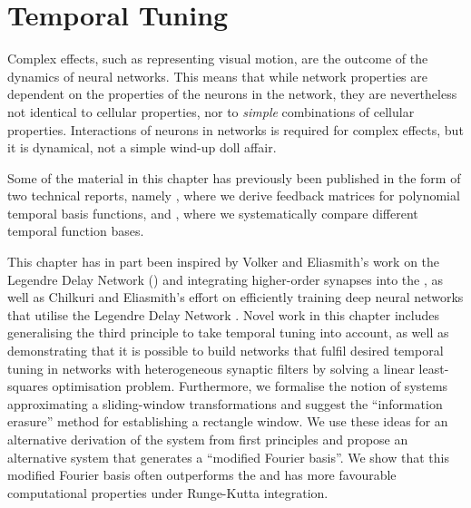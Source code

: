 \chapter{Temporal Tuning}
\label{chp:temporal_tuning}

\vspace{20pt}

\begin{OpeningQuote}
Complex effects, such as representing visual motion, are the outcome of the dynamics of neural networks. This means that while network properties are dependent on the properties of the neurons in the network, they are nevertheless not identical to cellular properties, nor to \emph{simple} combinations of cellular properties. Interactions of neurons in networks is required for complex effects, but it is dynamical, not a simple wind-up doll affair.
\end{OpeningQuote}

\begin{PriorPublication}
Some of the material in this chapter has previously been published in the form of two technical reports, namely \citet{stockel2021constructing}, where we derive feedback matrices for polynomial temporal basis functions, and \citet{stockel2021discrete}, where we systematically compare different temporal function bases.
\end{PriorPublication}

\begin{Contributions}
This chapter has in part been inspired by Volker and Eliasmith's work on the Legendre Delay Network (\LDN) and integrating higher-order synapses into the \NEF \citep{voelker2018improving,voelker2019}, as well as Chilkuri and Eliasmith's effort on efficiently training deep neural networks that utilise the Legendre Delay Network \citep{chilkuri2021parallelizing}.
Novel work in this chapter includes generalising the third \NEF principle to take temporal tuning into account, as well as demonstrating that it is possible to build networks that fulfil desired temporal tuning in networks with heterogeneous synaptic filters by solving a linear least-squares optimisation problem.
Furthermore, we formalise the notion of \LTI systems approximating a sliding-window transformations and suggest the \enquote{information erasure} method for establishing a rectangle window.
We use these ideas for an alternative derivation of the \LDN \LTI system from first principles and propose an alternative \LTI system that generates a \enquote{modified Fourier basis}.
We show that this modified Fourier basis often outperforms the \LDN \LTI and has more favourable computational properties under Runge-Kutta integration.
\end{Contributions}

